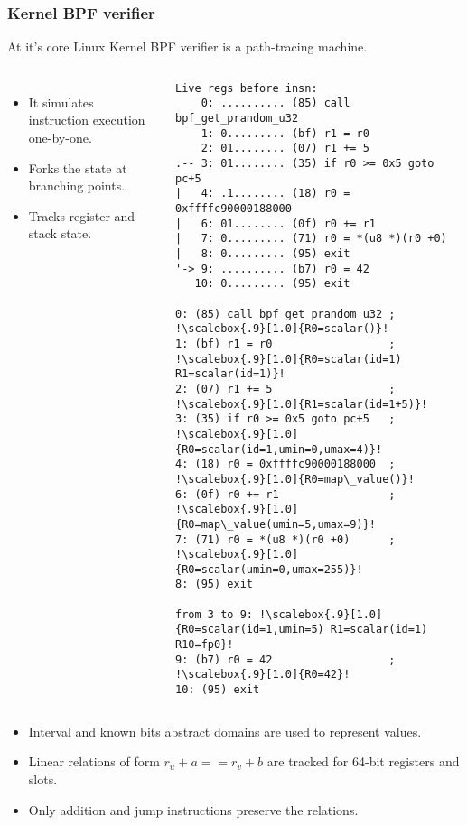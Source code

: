 \documentclass{beamer}
\begin{document}
\begin{frame}
  \frametitle{Kernel BPF verifier}

  At it's core Linux Kernel BPF verifier is a path-tracing machine.
  \begin{columns}[t]
    \scriptsize
    \begin{itemize}
    \item It simulates instruction execution one-by-one.
    \item Forks the state at branching points.
    \item Tracks register and stack state.
    \end{itemize}
    \begin{verbatim}
Live regs before insn:
    0: .......... (85) call bpf_get_prandom_u32
    1: 0......... (bf) r1 = r0
    2: 01........ (07) r1 += 5
.-- 3: 01........ (35) if r0 >= 0x5 goto pc+5
|   4: .1........ (18) r0 = 0xffffc90000188000
|   6: 01........ (0f) r0 += r1
|   7: 0......... (71) r0 = *(u8 *)(r0 +0)
|   8: 0......... (95) exit
'-> 9: .......... (b7) r0 = 42
   10: 0......... (95) exit

0: (85) call bpf_get_prandom_u32 ; !\scalebox{.9}[1.0]{R0=scalar()}!
1: (bf) r1 = r0                  ; !\scalebox{.9}[1.0]{R0=scalar(id=1) R1=scalar(id=1)}!
2: (07) r1 += 5                  ; !\scalebox{.9}[1.0]{R1=scalar(id=1+5)}!
3: (35) if r0 >= 0x5 goto pc+5   ; !\scalebox{.9}[1.0]{R0=scalar(id=1,umin=0,umax=4)}!
4: (18) r0 = 0xffffc90000188000  ; !\scalebox{.9}[1.0]{R0=map\_value()}!
6: (0f) r0 += r1                 ; !\scalebox{.9}[1.0]{R0=map\_value(umin=5,umax=9)}!
7: (71) r0 = *(u8 *)(r0 +0)      ; !\scalebox{.9}[1.0]{R0=scalar(umin=0,umax=255)}!
8: (95) exit

from 3 to 9: !\scalebox{.9}[1.0]{R0=scalar(id=1,umin=5) R1=scalar(id=1) R10=fp0}!
9: (b7) r0 = 42                  ; !\scalebox{.9}[1.0]{R0=42}!
10: (95) exit      
    \end{verbatim}
  \end{columns}

  \framebreak

    \scriptsize
    \begin{itemize}
    \item Interval and known bits abstract domains are used to represent values.
    \item Linear relations of form $r_u + a == r_v + b$ are tracked
      for 64-bit registers and slots.
    \item Only addition and jump instructions preserve the relations.
    \end{itemize}


\end{frame}
\end{document}
